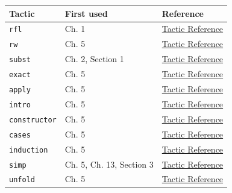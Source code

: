 \begin{longtable}[]{@{}
  >{\raggedright\arraybackslash}p{}
  >{\raggedright\arraybackslash}p{}
  >{\raggedright\arraybackslash}p{}@{}}
\toprule\noalign{}
\begin{minipage}[b]{\linewidth}\raggedright
Tactic
\end{minipage} & \begin{minipage}[b]{\linewidth}\raggedright
First used
\end{minipage} & \begin{minipage}[b]{\linewidth}\raggedright
Reference
\end{minipage} \\
\midrule\noalign{}
\endhead
\bottomrule\noalign{}
\endlastfoot
\texttt{rfl} & Ch. 1 & \href{https://lean-lang.org/doc/reference/latest/Tactic-Proofs/Tactic-Reference/}{Tactic Reference} \\
\texttt{rw} & Ch. 5 & \href{https://lean-lang.org/doc/reference/latest/Tactic-Proofs/Tactic-Reference/}{Tactic Reference} \\
\texttt{subst} & Ch. 2, Section 1 & \href{https://lean-lang.org/doc/reference/latest/Tactic-Proofs/Tactic-Reference/}{Tactic Reference} \\
\texttt{exact} & Ch. 5 & \href{https://lean-lang.org/doc/reference/latest/Tactic-Proofs/Tactic-Reference/}{Tactic Reference} \\
\texttt{apply} & Ch. 5 & \href{https://lean-lang.org/doc/reference/latest/Tactic-Proofs/Tactic-Reference/}{Tactic Reference} \\
\texttt{intro} & Ch. 5 & \href{https://lean-lang.org/doc/reference/latest/Tactic-Proofs/Tactic-Reference/}{Tactic Reference} \\
\texttt{constructor} & Ch. 5 & \href{https://lean-lang.org/doc/reference/latest/Tactic-Proofs/Tactic-Reference/}{Tactic Reference} \\
\texttt{cases} & Ch. 5 & \href{https://lean-lang.org/doc/reference/latest/Tactic-Proofs/Tactic-Reference/}{Tactic Reference} \\
\texttt{induction} & Ch. 5 & \href{https://lean-lang.org/doc/reference/latest/Tactic-Proofs/Tactic-Reference/}{Tactic Reference} \\
\texttt{simp} & Ch. 5, Ch. 13, Section 3 & \href{https://lean-lang.org/doc/reference/latest/Tactic-Proofs/Tactic-Reference/}{Tactic Reference} \\
\texttt{unfold} & Ch. 5 & \href{https://lean-lang.org/doc/reference/latest/Tactic-Proofs/Tactic-Reference/}{Tactic Reference} \\

\end{longtable}
